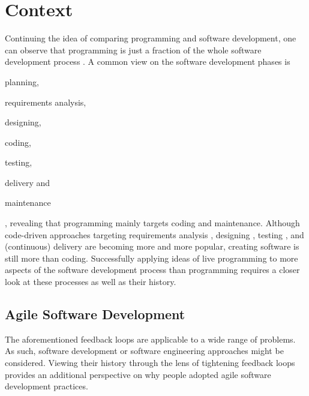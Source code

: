 \section{Context}
\label{sec:context}
Continuing the idea of comparing programming and software development, one can observe that programming is just a fraction of the whole software development process \cite{yang_phase_2008}.
A common view on the software development phases is \begin{enumerate*}[label=(\roman*)]
\item planning,
\item requirements analysis,
\item designing,
\item coding,
\item testing,
\item delivery and
\item maintenance \cite{mayr_projekt_2005}
\end{enumerate*},
revealing that programming mainly targets coding and maintenance.
Although code-driven approaches targeting requirements analysis \cite{sheldon_software_2000}, designing \cite{pimentel_requirements_2014}, testing \cite{beck_test-driven_2003}, and (continuous) delivery \cite{chen_continuous_2015} are becoming more and more popular, creating software is still more than coding.
Successfully applying ideas of live programming to more aspects of the software development process than programming requires a closer look at these processes as well as their history.


\subsection{Agile Software Development}
\label{sec:agile-movement}
The aforementioned feedback loops are applicable to a wide range of problems.
As such, software development or software engineering approaches might be considered.
Viewing their history through the lens of tightening feedback loops provides an additional perspective on why people adopted agile software development practices.

